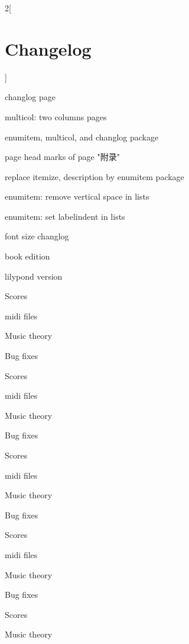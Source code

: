 {\begin{multicols*}{2}[\section*{Changelog}]
\begin{changelog}[author=李小丹, section=false]
\begin{version}[v=3.0-$\beta$(3.1415), date=2023-12-22]
	\added
		\item changlog page
		\item multicol: two columns pages
		\item enumitem, multicol, and changlog package
	\fixed
		\item page head marks of page "附录"
	\changed
		\item replace itemize, description by enumitem package
		\item enumitem: remove vertical space in lists
		\item enumitem: set labelindent in lists
		\item font size changlog
		\item book edition
		\item lilypond version
\end{version}
\begin{version}[v=2.9-$\beta$(3.141), date=2023-04-28]
	\added
		\item Scores
		\item midi files
		\item Music theory
	\fixed
		\item Bug fixes
\end{version}
\begin{version}[v=2.8-$\beta$(3.141), date=2023-04-24]
	\added
		\item Scores
		\item midi files
		\item Music theory
	\fixed
		\item Bug fixes
\end{version}
\begin{version}[v=2.7-$\beta$(3.141), date=2023-04-22]
	\added
		\item Scores
		\item midi files
		\item Music theory
	\fixed
		\item Bug fixes
\end{version}
\begin{version}[v=2.6-$\beta$(3.141), date=2023-04-15]
	\added
		\item Scores
		\item midi files
		\item Music theory
	\fixed
		\item Bug fixes
\end{version}
\begin{version}[v=2.5-$\beta$(3.141), date=2023-04-08]
	\added
		\item Scores
		\item Music theory

\end{version}
\end{changelog}
\end{multicols*}}
